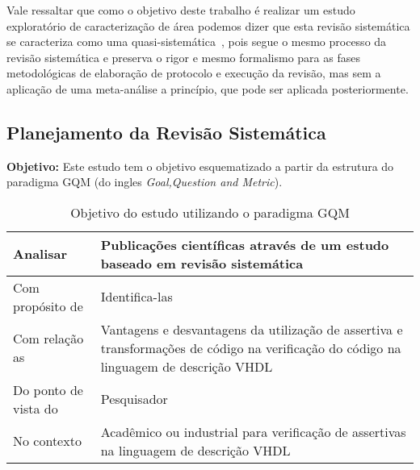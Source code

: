 \par
Vale ressaltar que como o objetivo deste trabalho é realizar um estudo exploratório de caracterização de área podemos dizer que esta revisão sistemática se caracteriza como uma quasi-sistemática~\cite{travassos2008environment}, pois segue o mesmo processo da revisão sistemática e preserva o rigor e mesmo formalismo para as fases metodológicas de elaboração de protocolo e execução da revisão, mas sem a aplicação de uma meta-análise a princípio, que pode ser aplicada posteriormente.

\subsection{Planejamento da Revisão Sistemática}

\par
\textbf{Objetivo:} Este estudo tem o objetivo esquematizado a partir da estrutura do paradigma GQM (do ingles \textit{Goal,Question and Metric})\cite{basili1994experience}.

\begin{table}[h!]
\centering
\label{}
\begin{tabularx}{\textwidth}{|l|X|}
\hline
Analisar & Publicações científicas através de um estudo baseado em revisão sistemática \\ \hline
Com propósito de & Identifica-las \\ \hline
Com relação as & Vantagens e desvantagens da utilização de assertiva e transformações de código na verificação do código na linguagem de descrição VHDL \\ \hline
Do ponto de vista do & Pesquisador \\ \hline
No contexto & Acadêmico ou industrial para verificação de assertivas na linguagem de descrição VHDL \\ \hline
\end{tabularx}
\caption{Objetivo do estudo utilizando o paradigma GQM}
\end{table}

